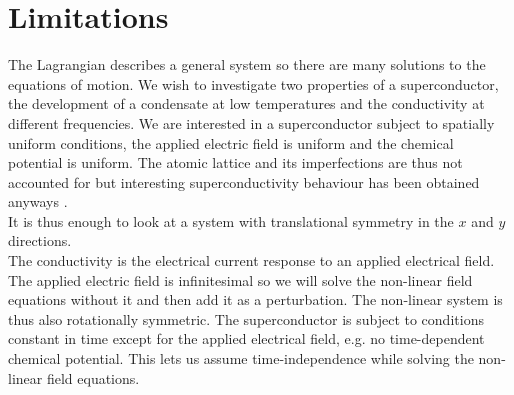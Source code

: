 \documentclass[12pt]{report}
\begin{document}
\section{Limitations}
The Lagrangian describes a general system so there are many solutions to the equations of motion. We wish to investigate two properties of a superconductor, the development of a condensate at low temperatures and the conductivity at different frequencies. We are interested in a superconductor subject to spatially uniform conditions, the applied electric field is uniform and the chemical potential is uniform. The atomic lattice and its imperfections are thus not accounted for but interesting superconductivity behaviour has been obtained anyways \cite{hartnoll9}.\\

It is thus enough to look at a system with translational symmetry in the $x$ and $y$ directions.\\

The conductivity is the electrical current response to an applied electrical field. The applied electric field is infinitesimal so we will solve the non-linear field equations without it and then add it as a perturbation. The non-linear system is thus also rotationally symmetric. The superconductor is subject to conditions constant in time except for the applied electrical field, e.g. no time-dependent chemical potential. This lets us assume time-independence while solving the non-linear field equations. 
\end{document}
